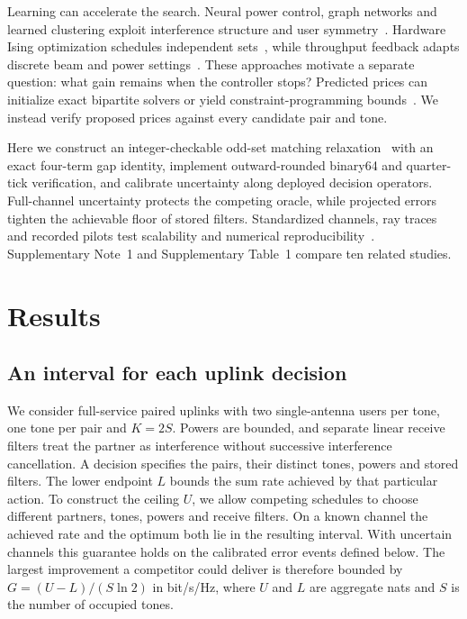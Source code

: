 \documentclass[lineno,pdflatex,sn-nature]{sn-jnl}
\begin{document}
Learning can accelerate the search. Neural power control, graph networks and learned clustering exploit interference structure and user symmetry~\cite{sun,shen,hejazicluster,ahmadi2026}. Hardware Ising optimization schedules independent sets~\cite{hamakawa2026}, while throughput feedback adapts discrete beam and power settings~\cite{kashimata2026}. These approaches motivate a separate question: what gain remains when the controller stops? Predicted prices can initialize exact bipartite solvers or yield constraint-programming bounds~\cite{dinitz,bessa}. We instead verify proposed prices against every candidate pair and tone.

Here we construct an integer-checkable odd-set matching relaxation~\cite{edmonds,kuhn} with an exact four-term gap identity, implement outward-rounded binary64 and quarter-tick verification, and calibrate uncertainty along deployed decision operators. Full-channel uncertainty protects the competing oracle, while projected errors tighten the achievable floor of stored filters. Standardized channels, ray traces and recorded pilots test scalability and numerical reproducibility~\cite{tr,sionna,deepmimo,zafari,renew,shepard}. Supplementary Note~1 and Supplementary Table~1 compare ten related studies.

\section*{Results}

\subsection*{An interval for each uplink decision}

We consider full-service paired uplinks with two single-antenna users per tone, one tone per pair and \(K=2S\). Powers are bounded, and separate linear receive filters treat the partner as interference without successive interference cancellation. A decision specifies the pairs, their distinct tones, powers and stored filters. The lower endpoint \(L\) bounds the sum rate achieved by that particular action. To construct the ceiling \(U\), we allow competing schedules to choose different partners, tones, powers and receive filters. On a known channel the achieved rate and the optimum both lie in the resulting interval. With uncertain channels this guarantee holds on the calibrated error events defined below. The largest improvement a competitor could deliver is therefore bounded by \(G=(U-L)/(S\ln 2)\) in bit/s/Hz, where \(U\) and \(L\) are aggregate nats and \(S\) is the number of occupied tones.
\end{document}
